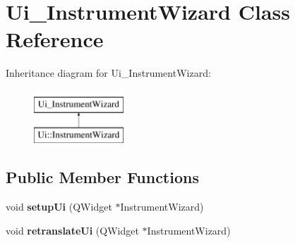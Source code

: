 \hypertarget{class_ui___instrument_wizard}{}\section{Ui\+\_\+\+Instrument\+Wizard Class Reference}
\label{class_ui___instrument_wizard}
Inheritance diagram for Ui\+\_\+\+Instrument\+Wizard\+:\begin{figure}[H]
\begin{center}
\leavevmode
\includegraphics[height=2.000000cm]{class_ui___instrument_wizard}
\end{center}
\end{figure}
\subsection*{Public Member Functions}
\begin{DoxyCompactItemize}
\item 
\mbox{\label{class_ui___instrument_wizard_af9d7d846cafffebd894519bcc24d9d75}} 
void {\bfseries setup\+Ui} (Q\+Widget $\ast$Instrument\+Wizard)
\item 
\mbox{\label{class_ui___instrument_wizard_a32b4475edc3dd859ae3ebc338d3460bb}} 
void {\bfseries retranslate\+Ui} (Q\+Widget $\ast$Instrument\+Wizard)
\end{DoxyCompactItemize}
